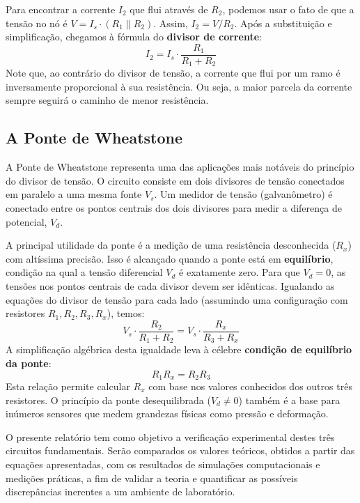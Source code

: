 \documentclass[a4paper, 12pt]{article}
\begin{document}
Para encontrar a corrente $I_2$ que flui através de $R_2$, podemos usar o fato de que a tensão no nó é $V = I_s \cdot (R_1 \parallel R_2)$. Assim, $I_2 = V/R_2$. Após a substituição e simplificação, chegamos à fórmula do \textbf{divisor de corrente}:
\begin{equation}
I_2 = I_s \cdot \frac{R_1}{R_1 + R_2}
\label{eq:divisor_corrente}
\end{equation}
Note que, ao contrário do divisor de tensão, a corrente que flui por um ramo é inversamente proporcional à sua resistência. Ou seja, a maior parcela da corrente sempre seguirá o caminho de menor resistência.

\subsection{A Ponte de Wheatstone}
A Ponte de Wheatstone representa uma das aplicações mais notáveis do princípio do divisor de tensão. O circuito consiste em dois divisores de tensão conectados em paralelo a uma mesma fonte $V_s$. Um medidor de tensão (galvanômetro) é conectado entre os pontos centrais dos dois divisores para medir a diferença de potencial, $V_d$.

A principal utilidade da ponte é a medição de uma resistência desconhecida ($R_x$) com altíssima precisão. Isso é alcançado quando a ponte está em \textbf{equilíbrio}, condição na qual a tensão diferencial $V_d$ é exatamente zero. Para que $V_d = 0$, as tensões nos pontos centrais de cada divisor devem ser idênticas. Igualando as equações do divisor de tensão para cada lado (assumindo uma configuração com resistores $R_1, R_2, R_3, R_x$), temos:
\[
V_s \cdot \frac{R_2}{R_1 + R_2} = V_s \cdot \frac{R_x}{R_3 + R_x}
\]
A simplificação algébrica desta igualdade leva à célebre \textbf{condição de equilíbrio da ponte}:
\begin{equation}
R_1 R_x = R_2 R_3
\label{eq:ponte_equilibrio}
\end{equation}
Esta relação permite calcular $R_x$ com base nos valores conhecidos dos outros três resistores. O princípio da ponte desequilibrada ($V_d \neq 0$) também é a base para inúmeros sensores que medem grandezas físicas como pressão e deformação.

O presente relatório tem como objetivo a verificação experimental destes três circuitos fundamentais. Serão comparados os valores teóricos, obtidos a partir das equações apresentadas, com os resultados de simulações computacionais e medições práticas, a fim de validar a teoria e quantificar as possíveis discrepâncias inerentes a um ambiente de laboratório.
\end{document}
